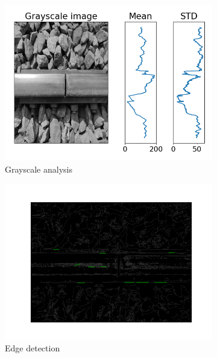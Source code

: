 \documentclass[10pt, final]{article}
\begin{document}
\begin{figure}[!ht]
	\centering
	\begin{subfigure}{0.3\textwidth}
		\centering
		\includegraphics[width=\textwidth]{./tex_graphs/rail_surf_gray.png}
		\caption{Grayscale analysis}
		\label{fig:rail_surf_gray}
	\end{subfigure}
	\begin{subfigure}{0.3\textwidth}
		\centering
		\includegraphics[width=\textwidth]{./tex_graphs/rail_surf_edge.png}
		\caption{Edge detection}
		\label{fig:rail_surf_edge}
	\end{subfigure}
	\begin{subfigure}{0.3\textwidth}
		\centering

\end{subfigure}
\end{figure}
\end{document}
